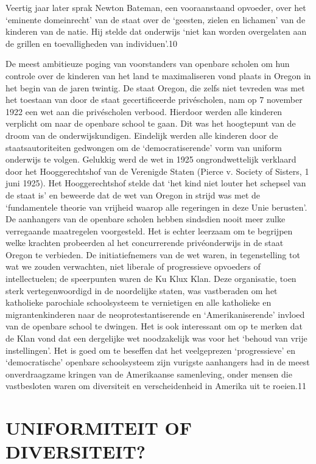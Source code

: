 \documentclass[
  a5paper,
  smalldemyvopaper,10pt,twoside,onecolumn,openright,extrafontsizes,hidelinks]{memoir}
\begin{document}
Veertig jaar later sprak Newton Bateman, een vooraanstaand opvoeder,
over het `eminente domeinrecht' van de staat over de `geesten, zielen en
lichamen' van de kinderen van de natie. Hij stelde dat onderwijs `niet
kan worden overgelaten aan de grillen en toevalligheden van
individuen'.10

De meest ambitieuze poging van voorstanders van openbare scholen om hun
controle over de kinderen van het land te maximaliseren vond plaats in
Oregon in het begin van de jaren twintig. De staat Oregon, die zelfs
niet tevreden was met het toestaan van door de staat gecertificeerde
privéscholen, nam op 7 november 1922 een wet aan die privéscholen
verbood. Hierdoor werden alle kinderen verplicht om naar de openbare
school te gaan. Dit was het hoogtepunt van de droom van de
onderwijskundigen. Eindelijk werden alle kinderen door de
staatsautoriteiten gedwongen om de `democratiserende' vorm van uniform
onderwijs te volgen. Gelukkig werd de wet in 1925 ongrondwettelijk
verklaard door het Hooggerechtshof van de Verenigde Staten (Pierce v.
Society of Sisters, 1 juni 1925). Het Hooggerechtshof stelde dat `het
kind niet louter het schepsel van de staat is' en beweerde dat de wet
van Oregon in strijd was met de `fundamentele theorie van vrijheid
waarop alle regeringen in deze Unie berusten'. De aanhangers van de
openbare scholen hebben sindsdien nooit meer zulke verregaande
maatregelen voorgesteld. Het is echter leerzaam om te begrijpen welke
krachten probeerden al het concurrerende privéonderwijs in de staat
Oregon te verbieden. De initiatiefnemers van de wet waren, in
tegenstelling tot wat we zouden verwachten, niet liberale of
progressieve opvoeders of intellectuelen; de speerpunten waren de Ku
Klux Klan. Deze organisatie, toen sterk vertegenwoordigd in de
noordelijke staten, was vastberaden om het katholieke parochiale
schoolsysteem te vernietigen en alle katholieke en migrantenkinderen
naar de neoprotestantiserende en `Amerikaniserende' invloed van de
openbare school te dwingen. Het is ook interessant om op te merken dat
de Klan vond dat een dergelijke wet noodzakelijk was voor het `behoud
van vrije instellingen'. Het is goed om te beseffen dat het veelgeprezen
`progressieve' en `democratische' openbare schoolsysteem zijn vurigste
aanhangers had in de meest onverdraagzame kringen van de Amerikaanse
samenleving, onder mensen die vastbesloten waren om diversiteit en
verscheidenheid in Amerika uit te roeien.11

\section{\texorpdfstring{\textbf{UNIFORMITEIT OF
DIVERSITEIT?}}{UNIFORMITEIT OF DIVERSITEIT?}}\label{uniformiteit-of-diversiteit}
\end{document}
